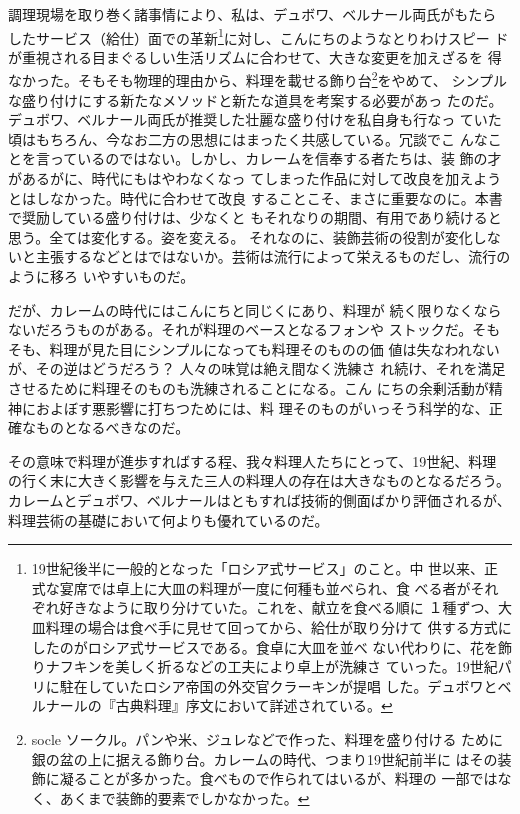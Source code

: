 調理現場を取り巻く諸事情により、私は、デュボワ、ベルナール両氏がもたら
したサービス（給仕）面での革新\footnote{19世紀後半に一般的となった「ロシア式サービス」のこと。中
  世以来、正式な宴席では卓上に大皿の料理が一度に何種も並べられ、食
  べる者がそれぞれ好きなように取り分けていた。これを、献立を食べる順に
  １種ずつ、大皿料理の場合は食べ手に見せて回ってから、給仕が取り分けて
  供する方式にしたのがロシア式サービスである。食卓に大皿を並べ
  ない代わりに、花を飾りナフキンを美しく折るなどの工夫により卓上が洗練さ
  ていった。19世紀パリに駐在していたロシア帝国の外交官クラーキンが提唱
  した。デュボワとベルナールの『古典料理』序文において詳述されている。}に対し、こんにちのようなとりわけスピー
ドが重視される目まぐるしい生活リズムに合わせて、大きな変更を加えざるを
得なかった。そもそも物理的理由から、料理を載せる飾り台\footnote{socle
  ソークル。パンや米、ジュレなどで作った、料理を盛り付ける
  ために銀の盆の上に据える飾り台。カレームの時代、つまり19世紀前半に
  はその装飾に凝ることが多かった。食べもので作られてはいるが、料理の
  一部ではなく、あくまで装飾的要素でしかなかった。}をやめて、
シンプルな盛り付けにする新たなメソッドと新たな道具を考案する必要があっ
たのだ。デュボワ、ベルナール両氏が推奨した壮麗な盛り付けを私自身も行なっ
ていた頃はもちろん、今なお二方の思想にはまったく共感している。冗談でこ
んなことを言っているのではない。しかし、カレームを信奉する者たちは、装
飾の才があるがに、時代にもはやわなくなっ
てしまった作品に対して改良を加えようとはしなかった。時代に合わせて改良
することこそ、まさに重要なのに。本書で奨励している盛り付けは、少なくと
もそれなりの期間、有用であり続けると思う。全ては変化する。姿を変える。
それなのに、装飾芸術の役割が変化しないと主張するなどとはではないか。芸術は流行によって栄えるものだし、流行のように移ろ
いやすいものだ。

だが、カレームの時代にはこんにちと同じくにあり、料理が
続く限りなくならないだろうものがある。それが料理のベースとなるフォンや
ストックだ。そもそも、料理が見た目にシンプルになっても料理そのものの価
値は失なわれないが、その逆はどうだろう？ 人々の味覚は絶え間なく洗練さ
れ続け、それを満足させるために料理そのものも洗練されることになる。こん
にちの余剰活動が精神におよぼす悪影響に打ちつためには、料
理そのものがいっそう科学的な、正確なものとなるべきなのだ。

その意味で料理が進歩すればする程、我々料理人たちにとって、19世紀、料理
の行く末に大きく影響を与えた三人の料理人の存在は大きなものとなるだろう。
カレームとデュボワ、ベルナールはともすれば技術的側面ばかり評価されるが、
料理芸術の基礎において何よりも優れているのだ。

